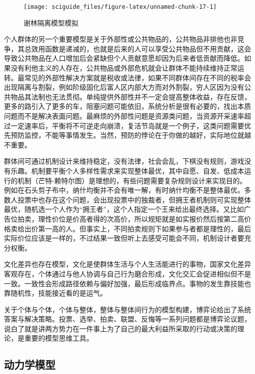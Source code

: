 \documentclass[]{tufte-book}
\begin{document}
\begin{figure}
\texttt{[image: sciguide\_files/figure-latex/unnamed-chunk-17-1]} \caption[谢林隔离模型模拟]{谢林隔离模型模拟}\label{fig:unnamed-chunk-17}
\end{figure}

个人群体的另一个重要模型是关于外部性或公共物品的，公共物品非排他也非竞争，其总效用函数是递减的，也就是后来的人可以享受公共物品但不用贡献，这会导致公共物品在人口增加后会紧缺但个人贡献意愿却因为后来者低贡献而降低。如果没有利他主义的人存在，公共物品或外部危机就会让群体不能持续维持正常运转。最常见的外部性解决方案就是税收或法律，如果不同群体间存在不同的税率会出现隔离与割裂，例如阶级固化后富人区内部大方而对外割裂，穷人区因为没有公共物品其法制也无法贯彻。单纯提供外部性并不一定会提高整体收益，存在反馈，更多的路引入了更多的车，阻塞问题可能依旧，系统分析是很有必要的，找出本质问题而不是解决表面问题。最麻烦的外部性问题是资源类问题，当资源开采速率超过一定速率后，平衡将不可逆走向崩溃，复活节岛就是一个例子，这类问题需要优先预防监控，不能等事情发生。当然，预防的悖论在于你做的越好，实际地位就越不重要。

群体间可通过机制设计来维持稳定，没有法律，社会会乱，下棋没有规则，游戏没有乐趣。机制要平衡个人多样性需求来实现整体最优，其中自愿、自发、低成本运行的机制（芒特-赖特尔图）是理想的，有些问题需要复杂规则设计来实现目的。例如在石头剪子布中，纳什均衡并不会有唯一解，有时纳什均衡不是整体最优。多数人投票中也存在这个问题，会出现投票中的独裁者，但拥王者机制则可实现整体最优，随机选一个人作为``拥王者''，这个人指定一个王来给出最终选择。又比如广告位拍卖，理性价位是价高者得的次高价，所以规矩就是如实报价然后按第二高价格卖给出价第一高的人。但事实上，不同拍卖规则下如果参与者都是理性的，最后实际价位应该是一样的，不过结果一致但听上去感受可能会不同，机制设计者要充分权衡。

文化差异也存在模型，文化是使群体生活与个人生活能进行的事物，国家文化差异客观存在，个体通过与他人协调与自己行为磨合形成，文化交汇会促进相似但不是一致。一致性会形成路径依赖与偏好加强，最后形成临界点。事物的发生靠技能也靠随机性，技能接近看的是运气。

关于个体与个体，个体与整体，整体与整体间行为的模型构建，博弈论给出了系统答案与解决策略。投票、选举、拍卖、联盟、反悔等一系列问题都是博弈论议题，说白了就是讲两方势力在一件事上为了自己的最大利益所采取的行动或决策的理论，是重要的模型思维工具。

\hypertarget{ux52a8ux529bux5b66ux6a21ux578b}{%
\subsection{动力学模型}\label{ux52a8ux529bux5b66ux6a21ux578b}}
\end{document}
